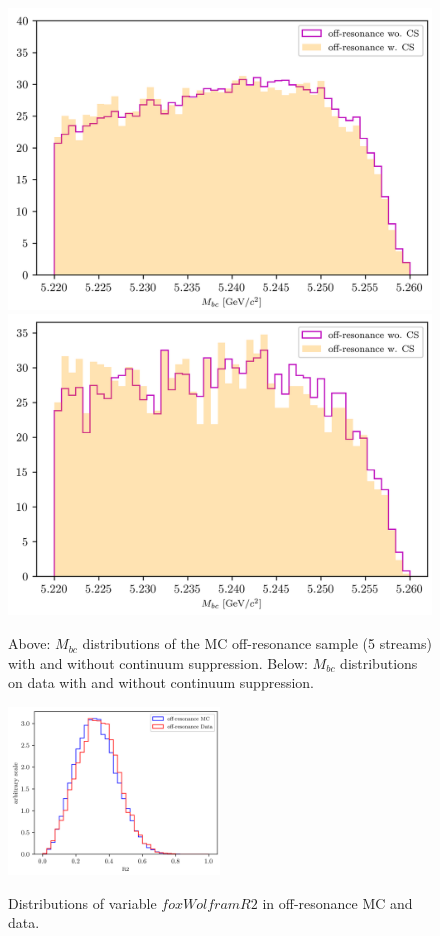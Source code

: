 \begin{figure}
\centering
\subcaptionbox{\label{fig:corrLambdaC_OffResonance_w_wo_CS_comparison_5streams}}
{\includegraphics[width=.65\textwidth]{04-chargedCorrBtoLambda/figs/corrLambdaC_OffResonance_w_wo_CS_comparison_5streams.png}} 
\subcaptionbox{\label{fig:corrLambdaC_OffResonance_w_wo_CS_comparison_Data}}
{\includegraphics[width=.65\textwidth]{04-chargedCorrBtoLambda/figs/corrLambdaC_OffResonance_w_wo_CS_comparison_Data.png}} 
\caption{Above: $M_{bc}$ distributions of the MC off-resonance sample (5 streams) with and without continuum suppression. Below: $M_{bc}$ distributions on data with and without continuum suppression.}
\end{figure}



\begin{figure}[h!]
{\includegraphics[width=0.5\textwidth]{04-chargedCorrBtoLambda/figs/R2_MC-Data_off_resonance_distributions.png}}
\caption{Distributions of variable $foxWolframR2$ in off-resonance MC and data.}
\label{fig:R2_MC-Data_off_resonance_distributions}
\end{figure}




